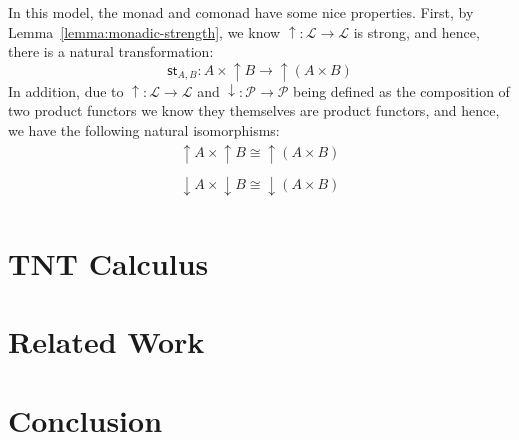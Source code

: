 \documentclass{article}
\let\mto\to
\let\to\rightarrow
\newcommand{\cat}[1]{\mathcal{#1}}
\newcommand{\uar}[0]{\mathop{\uparrow}}
\newcommand{\dar}[0]{\mathop{\downarrow}}
\newcommand{\st}[1]{\mathsf{st}_{#1}}
\begin{document}
In this model, the monad and comonad have some nice properties.  First,
by Lemma~\ref{lemma:monadic-strength}, we know $\uar : \cat{L} \to
\cat{L}$ is strong, and hence, there is a natural transformation:
\[
\st{A,B} : A \times \uar B \mto \uar (A \times B)
\]
In addition, due to $\uar : \cat{L} \to \cat{L}$ and $\dar : \cat{P}
\to \cat{P}$ being defined as the composition of two product functors
we know they themselves are product functors, and hence, we have the
following natural isomorphisms:
\[
\begin{array}{lll}
  \uar A \times \uar B \cong \uar (A \times B)\\
  \\
  \dar A \times \dar B \cong \dar (A \times B)\\
\end{array}
\]


\section{TNT Calculus}
\label{sec:tnt_calculus}




\section{Related Work}
\label{sec:related_work}

\section{Conclusion}
\label{sec:conclusion}




\nocite{*}
\appendix




\end{document}
